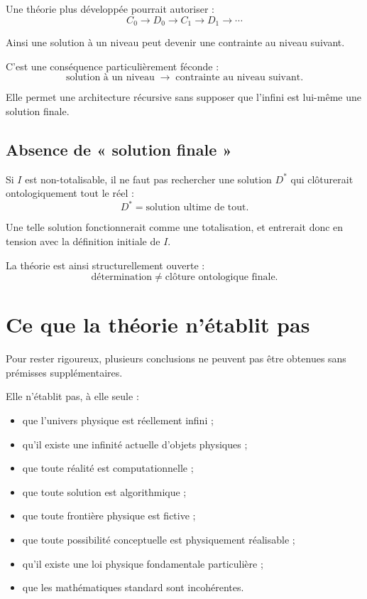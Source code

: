 \documentclass[11pt,a4paper]{article}
\begin{document}
Une théorie plus développée pourrait autoriser :
\[
C_0\to D_0\to C_1\to D_1\to\cdots
\]

Ainsi une solution à un niveau peut devenir une contrainte au niveau suivant.

C'est une conséquence particulièrement féconde :
\[
\boxed{
\text{solution à un niveau}
\;\longrightarrow\;
\text{contrainte au niveau suivant}.
}
\]

Elle permet une architecture récursive sans supposer que l'infini est lui-même
une solution finale.

\subsection{Absence de « solution finale »}

Si \(I\) est non-totalisable, il ne faut pas rechercher une solution \(D^\ast\)
qui clôturerait ontologiquement tout le réel :
\[
D^\ast=\text{solution ultime de tout}.
\]

Une telle solution fonctionnerait comme une totalisation, et entrerait donc en
tension avec la définition initiale de \(I\).

La théorie est ainsi structurellement ouverte :
\[
\boxed{
\text{détermination}\neq\text{clôture ontologique finale}.
}
\]

\section{Ce que la théorie n'établit pas}

Pour rester rigoureux, plusieurs conclusions ne peuvent pas être obtenues
sans prémisses supplémentaires.

Elle n'établit pas, à elle seule :
\begin{itemize}
\item que l'univers physique est réellement infini ;
\item qu'il existe une infinité actuelle d'objets physiques ;
\item que toute réalité est computationnelle ;
\item que toute solution est algorithmique ;
\item que toute frontière physique est fictive ;
\item que toute possibilité conceptuelle est physiquement réalisable ;
\item qu'il existe une loi physique fondamentale particulière ;
\item que les mathématiques standard sont incohérentes.
\end{itemize}
\end{document}
